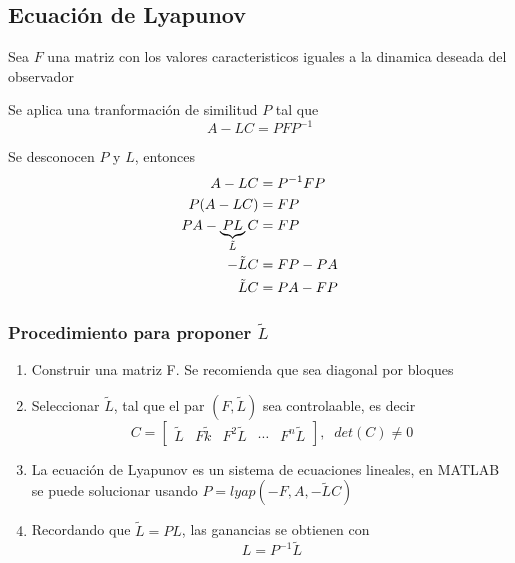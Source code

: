 \subsection{Ecuación de Lyapunov}

Sea \( F \) una matriz con los valores caracteristicos iguales a la dinamica deseada del observador

Se aplica una tranformación de similitud \( P \) tal que 
\[
    A-LC = PFP^{-1}
\]

Se desconocen \( P \) y \( L \), entonces
\[
    \begin{split}
        A-LC & = P^{-1}FP \\
        P(A-LC) & = FP \\
        PA - \underbrace{PL}_{\Tilde{L}}C & = FP\\
        -\tilde{L}C & = FP-PA\\
        \tilde{L}C & = PA-FP\\
    \end{split}
\]

\subsubsection{Procedimiento para proponer \( \tilde{L} \)}

\begin{enumerate}
    \item Construir una matriz F. Se recomienda que sea diagonal por bloques
    \item Seleccionar \(\tilde{L}\), tal que el par \( (F, \tilde{L}) \) sea controlaable, es decir
        \[
            C = \begin{bmatrix}
                    \tilde{L} &
                    F\tilde{k} &
                    F^{2}\tilde{L} &
                    \cdots &
                    F^{n}\tilde{L}
                \end{bmatrix}, \;\;  det(C) \not= 0
        \]
    \item La ecuación de Lyapunov es un sistema de ecuaciones lineales, en MATLAB se puede solucionar usando \( P=lyap(-F, A, -\tilde{L}C) \)
    \item Recordando que \( \tilde{L} = PL \), las ganancias se obtienen con 
    \[
            L = P^{-1}\tilde{L}
    \]
\end{enumerate}